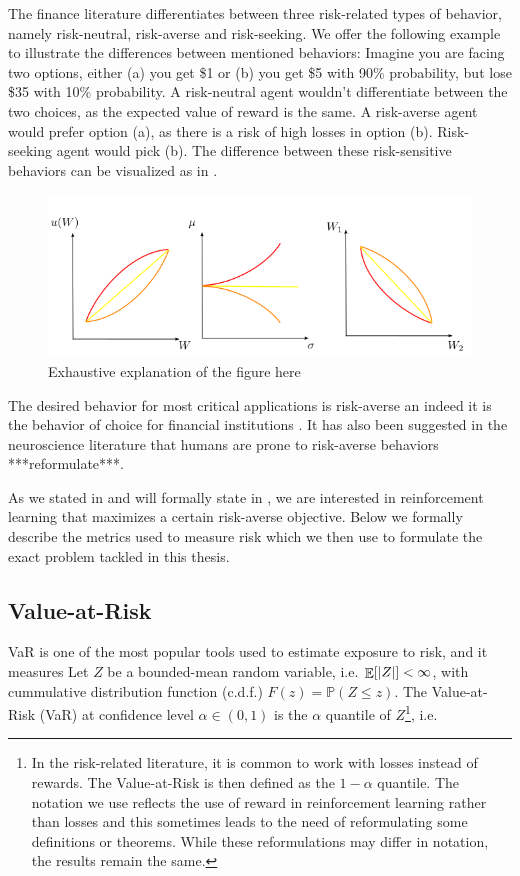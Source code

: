 The finance literature differentiates between three risk-related types of behavior, namely risk-neutral, risk-averse and risk-seeking. We offer the following example to illustrate the differences between mentioned behaviors: Imagine you are facing two options, either (a) you get \$1 or (b) you get \$5 with 90\% probability, but lose \$35 with 10\% probability. A risk-neutral agent wouldn't differentiate between the two choices, as the expected value of reward is the same. A risk-averse agent would prefer option (a), as there is a risk of high losses in option (b). Risk-seeking agent would pick (b). The difference between these risk-sensitive behaviors can be visualized as in .

\begin{figure}
\center
\includegraphics[width=\linewidth]{gfx/risk_behavior.png}
\caption{Exhaustive explanation of the figure here}
\label{fig:prelim:risk}
\end{figure}

The desired behavior for most critical applications is risk-averse an indeed it is the behavior of choice for financial institutions \citep{basel2013fundamental}. It has also been suggested in the neuroscience literature that humans are prone to risk-averse behaviors ***reformulate***\citep{shen2014risk}.

As we stated in  and will formally state in , we are interested in reinforcement learning that maximizes a certain risk-averse objective. Below we formally describe the metrics used to measure risk which we then use to formulate the exact problem tackled in this thesis.


\subsection{Value-at-Risk}

\citep{wipplinger2007philippe}
VaR is one of the most popular tools used to estimate exposure to risk, and it measures
Let $Z$ be a bounded-mean random variable, i.e. $\mathop{\mathbb{E}}[|Z|] < \infty$, with cummulative distribution function (c.d.f.) $F(z) = \mathbb{P}(Z \le z)$.
The Value-at-Risk (VaR) at confidence level $\alpha \in (0,1)$ is the $\alpha$ quantile of $Z$\footnote{In the risk-related literature, it is common to work with losses instead of rewards. The Value-at-Risk is then defined as the $1-\alpha$ quantile. The notation we use reflects the use of reward in reinforcement learning rather than losses and this sometimes leads to the need of reformulating some definitions or theorems. While these reformulations may differ in notation, the results remain the same.}, i.e. 

